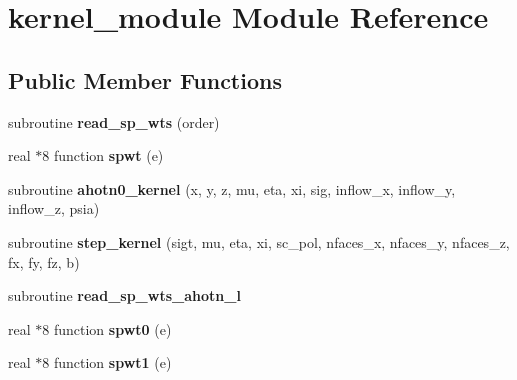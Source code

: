 \hypertarget{classkernel__module}{\section{kernel\-\_\-module Module Reference}
\label{classkernel__module}
}
\subsection*{Public Member Functions}
\begin{DoxyCompactItemize}
\item 
\hypertarget{classkernel__module_ac5350d99b77155ff299f25b6d70cea2d}{subroutine {\bfseries read\-\_\-sp\-\_\-wts} (order)}\label{classkernel__module_ac5350d99b77155ff299f25b6d70cea2d}

\item 
\hypertarget{classkernel__module_a6c7125e68f81cb0e7cd9f3e48abc126e}{real $\ast$8 function {\bfseries spwt} (e)}\label{classkernel__module_a6c7125e68f81cb0e7cd9f3e48abc126e}

\item 
\hypertarget{classkernel__module_a23d3af9299716bd83f7c2cd31d59bd4f}{subroutine {\bfseries ahotn0\-\_\-kernel} (x, y, z, mu, eta, xi, sig, inflow\-\_\-x, inflow\-\_\-y, inflow\-\_\-z, psia)}\label{classkernel__module_a23d3af9299716bd83f7c2cd31d59bd4f}

\item 
\hypertarget{classkernel__module_af428ae06d5e559edbf278d33f3628296}{subroutine {\bfseries step\-\_\-kernel} (sigt, mu, eta, xi, sc\-\_\-pol, nfaces\-\_\-x, nfaces\-\_\-y, nfaces\-\_\-z, fx, fy, fz, b)}\label{classkernel__module_af428ae06d5e559edbf278d33f3628296}

\item 
\hypertarget{classkernel__module_aa7cb328967dc7b6b33a0c922daed7cb7}{subroutine {\bfseries read\-\_\-sp\-\_\-wts\-\_\-ahotn\-\_\-l}}\label{classkernel__module_aa7cb328967dc7b6b33a0c922daed7cb7}

\item 
\hypertarget{classkernel__module_a0e94ea76b266be88663f608c0646f6d1}{real $\ast$8 function {\bfseries spwt0} (e)}\label{classkernel__module_a0e94ea76b266be88663f608c0646f6d1}

\item 
\hypertarget{classkernel__module_aa29c22ba87ecbc4ba8ab0d04c54783e0}{real $\ast$8 function {\bfseries spwt1} (e)}\label{classkernel__module_aa29c22ba87ecbc4ba8ab0d04c54783e0}


\end{DoxyCompactItemize}
